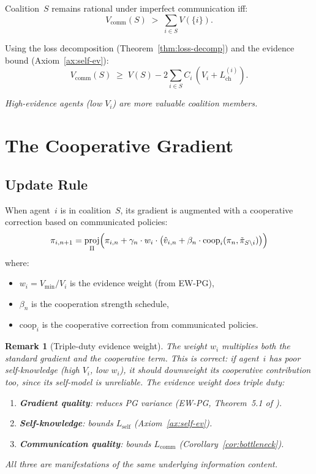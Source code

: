 \documentclass[11pt]{article}
\newtheorem{remark}[theorem]{Remark}
\DeclareMathOperator{\proj}{proj}
\begin{document}
Coalition~$S$ remains rational under imperfect communication iff:
\begin{equation}
  V_{\text{comm}}(S) \;>\; \sum_{i \in S} V(\{i\}).
\end{equation}

Using the loss decomposition (Theorem~\ref{thm:loss-decomp}) and the
evidence bound (Axiom~\ref{ax:self-ev}):
\begin{equation}
  V_{\text{comm}}(S) \;\geq\; V(S) - 2\sum_{i \in S} C_i\,(V_i + L_{\text{ch}}^{(i)}).
\end{equation}

\emph{High-evidence agents (low $V_i$) are more valuable coalition members.}


\section{The Cooperative Gradient}

\subsection{Update Rule}

When agent~$i$ is in coalition~$S$, its gradient is augmented with a
cooperative correction based on communicated policies:
\begin{equation}\label{eq:coop-update}
  \pi_{i,n+1} = \proj_\Pi\Bigl(\pi_{i,n} + \gamma_n \cdot w_i \cdot
    \bigl(\hat{v}_{i,n} + \beta_n \cdot \text{coop}_i(\pi_n, \tilde{\pi}_{S \setminus i})\bigr)\Bigr)
\end{equation}
where:
\begin{itemize}
  \item $w_i = V_{\min}/V_i$ is the evidence weight (from EW-PG),
  \item $\beta_n$ is the cooperation strength schedule,
  \item $\text{coop}_i$ is the cooperative correction from communicated policies.
\end{itemize}

\begin{remark}[Triple-duty evidence weight]
The weight $w_i$ multiplies \emph{both} the standard gradient and the
cooperative term. This is correct: if agent~$i$ has poor self-knowledge
(high $V_i$, low $w_i$), it should downweight its cooperative contribution
too, since its self-model is unreliable. The evidence weight does triple duty:
\begin{enumerate}
  \item \textbf{Gradient quality}: reduces PG variance (EW-PG, Theorem~5.1 of \cite{ewpg}).
  \item \textbf{Self-knowledge}: bounds $L_{\text{self}}$ (Axiom~\ref{ax:self-ev}).
  \item \textbf{Communication quality}: bounds $L_{\text{comm}}$ (Corollary~\ref{cor:bottleneck}).
\end{enumerate}
All three are manifestations of the same underlying information content.
\end{remark}
\end{document}

